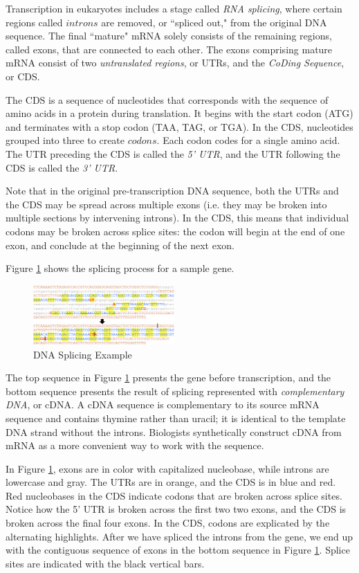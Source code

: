 \documentclass[letterpaper]{article}
\begin{document}
Transcription in eukaryotes includes a stage called \textit{RNA splicing}, where certain regions called $introns$ are removed, or ``spliced out," from the original DNA sequence. The final ``mature" mRNA solely consists of the remaining regions, called exons, that are connected to each other. The exons comprising mature mRNA consist of two \textit{untranslated regions}, or UTRs, and the \textit{CoDing Sequence}, or CDS. 

The CDS is a sequence of nucleotides that corresponds with the sequence of amino acids in a protein during translation. It begins with the start codon (ATG) and terminates with a stop codon (TAA, TAG, or TGA). In the CDS, nucleotides grouped into three to create $codons$. Each codon codes for a single amino acid. The UTR preceding the CDS is called the \textit{5' UTR}, and the UTR following the CDS is called the \textit{3' UTR}.

Note that in the original pre-transcription DNA sequence, both the UTRs and the CDS may be spread across multiple exons (i.e. they may be broken into multiple sections by intervening introns). In the CDS, this means that individual codons may be broken across splice sites: the codon will begin at the end of one exon, and conclude at the beginning of the next exon.

Figure \ref{fig:gene} shows the splicing process for a sample gene. 

\begin{figure}[h!]
\centering
\includegraphics[width=0.48\textwidth]{images/gene.png}
  \caption{DNA Splicing Example}\label{fig:gene}
  \vspace{-3mm}
\end{figure}

The top sequence in Figure \ref{fig:gene} presents the gene before transcription, and the bottom sequence presents the result of splicing represented with \textit{complementary DNA}, or cDNA. A cDNA sequence is complementary to its source mRNA sequence and contains thymine rather than uracil; it is identical to the template DNA strand without the introns. Biologists synthetically construct cDNA from mRNA as a more convenient way to work with the sequence.

In Figure \ref{fig:gene}, exons are in color with capitalized nucleobase, while introns are lowercase and gray. The UTRs are in orange, and the CDS is in blue and red. Red nucleobases in the CDS indicate codons that are broken across splice sites. Notice how the 5' UTR is broken across the first two two exons, and the CDS is broken across the final four exons. In the CDS, codons are explicated by the alternating highlights. After we have spliced the introns from the gene, we end up with the contiguous sequence of exons in the bottom sequence in Figure \ref{fig:gene}. Splice sites are indicated with the black vertical bars.
\end{document}
